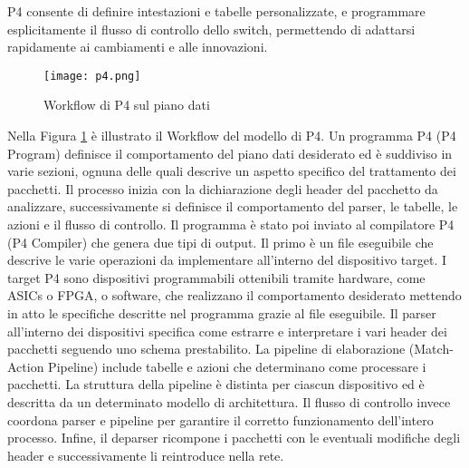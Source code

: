 P4 consente di definire intestazioni e tabelle personalizzate, e programmare esplicitamente il flusso di controllo dello switch, permettendo di adattarsi rapidamente ai cambiamenti e alle innovazioni.
\begin{figure}[h]
    \centering
   \texttt{[image: p4.png]}
    \caption{Workflow di P4 sul piano dati \cite{p4Article}}
    \label{fig:p4}
\end{figure}
\newline Nella Figura \ref{fig:p4} è illustrato il Workflow del modello di P4.
\newline Un programma P4 (P4 Program) definisce il comportamento del piano dati desiderato ed è suddiviso in varie sezioni, ognuna delle quali descrive un aspetto specifico del trattamento dei pacchetti.
Il processo inizia con la dichiarazione degli header del pacchetto da analizzare, successivamente si
definisce il comportamento del parser, le tabelle, le azioni e il flusso di controllo.
\newline Il programma è stato poi inviato al compilatore P4 (P4 Compiler) che genera due tipi di output. 
Il primo è un file eseguibile che descrive le varie operazioni da implementare all'interno del dispositivo target.
I target P4 sono dispositivi programmabili ottenibili tramite hardware, come ASICs o FPGA, o software, che realizzano il comportamento desiderato mettendo in atto le specifiche descritte nel programma grazie al file eseguibile.
Il parser all'interno dei dispositivi specifica come estrarre e interpretare i vari header dei pacchetti seguendo uno schema prestabilito.
\newline La pipeline di elaborazione (Match-Action Pipeline) include tabelle e azioni che determinano come processare i pacchetti. %
La struttura della pipeline è distinta per ciascun dispositivo ed è descritta da un determinato modello di architettura.
Il flusso di controllo invece coordona parser e pipeline per garantire il corretto funzionamento dell'intero processo.
Infine, il deparser ricompone i pacchetti con le eventuali modifiche degli header e successivamente li reintroduce nella rete.
